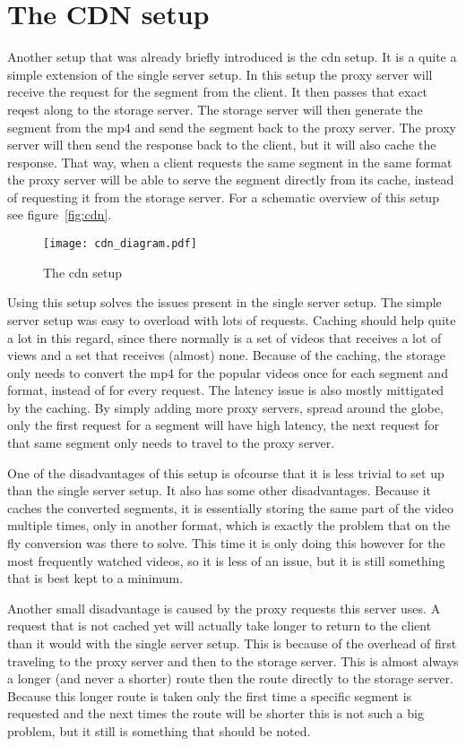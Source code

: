 \documentclass[twoside,openright]{uva-bachelor-thesis}
\begin{document}
\section{The CDN setup}
Another setup that was already briefly introduced is the \gls{cdn} setup. It is
a quite a simple extension of the single server setup. In this setup the proxy
server will receive the request for the segment from the client. It then passes
that exact reqest along to the storage server. The storage server will then
generate the segment from the mp4 and send the segment back to the proxy server.
The proxy server will then send the response back to the client, but it will
also cache the response. That way, when a client requests the same segment in
the same format the proxy server will be able to serve the segment directly from
its cache, instead of requesting it from the storage server. For a schematic
overview of this setup see figure~\vref{fig:cdn}.

\begin{figure}[h]
    \texttt{[image: cdn\_diagram.pdf]}
    \caption{The \gls{cdn} setup}\label{fig:cdn}
\end{figure}

Using this setup solves the issues present in the single server
setup. The simple server setup was easy to overload with lots of requests.
Caching should help quite a lot in this regard, since there normally is a set of
videos that receives a lot of views and a set that receives (almost) none.
Because of the caching, the storage only needs to convert the mp4 for the
popular videos once for each segment and format, instead of for every request.
The latency issue is also mostly mittigated by the caching. By simply adding
more proxy servers, spread around the globe, only the first request for a
segment will have high latency, the next request for that same segment only
needs to travel to the proxy server.

One of the disadvantages of this setup is ofcourse that it is less trivial to
set up than the single server setup. It also has some other disadvantages.
Because it caches the converted segments, it is essentially storing the same
part of the video multiple times, only in another format, which is exactly the
problem that on the fly conversion was there to solve. This time it is only
doing this however for the most frequently watched videos, so it is less of an
issue, but it is still something that is best kept to a minimum.

Another small disadvantage is caused by the proxy requests this server uses. A
request that is not cached yet will actually take longer to return to the
client than it would with the single server setup. This is because of the
overhead of first traveling to the proxy server and then to the storage server.
This is almost always a longer (and never a shorter) route then the route
directly to the storage server. Because this longer route is taken only the
first time a specific segment is requested and the next times the route will be
shorter this is not such a big problem, but it still is something that should be
noted.
\end{document}

